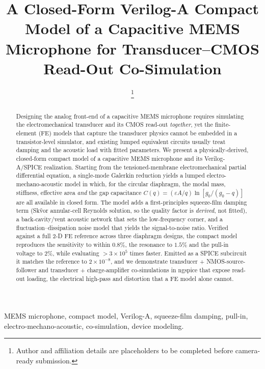 \documentclass[conference]{IEEEtran}
\begin{document}
\title{A Closed-Form Verilog-A Compact Model of a Capacitive MEMS Microphone
for Transducer--CMOS Read-Out Co-Simulation}

\author{
\thanks{Author and affiliation details are placeholders to be completed before
camera-ready submission.}}

\maketitle

\begin{abstract}
Designing the analog front-end of a capacitive MEMS microphone requires
simulating the electromechanical transducer and its CMOS read-out
\emph{together}, yet the finite-element (FE) models that capture the transducer
physics cannot be embedded in a transistor-level simulator, and existing
lumped equivalent circuits usually treat damping and the acoustic load with
fitted parameters. We present a physically-derived, closed-form compact model of
a capacitive MEMS microphone and its Verilog-A/SPICE realization. Starting from
the tensioned-membrane electromechanical partial differential equation, a
single-mode Galerkin reduction yields a lumped electro-mechano-acoustic model in
which, for the circular diaphragm, the modal mass, stiffness, effective area
\emph{and} the gap capacitance $C(q)=(\varepsilon A/q)\ln[g_0/(g_0-q)]$ are all
available in closed form. The model adds a first-principles squeeze-film damping
term (Sk\v{v}or annular-cell Reynolds solution, so the quality factor is
\emph{derived}, not fitted), a back-cavity/vent acoustic network that sets the
low-frequency corner, and a fluctuation--dissipation noise model that yields the
signal-to-noise ratio. Verified against a full 2-D FE reference across three
diaphragm designs, the compact model reproduces the sensitivity to within
$0.8\%$, the resonance to $1.5\%$ and the pull-in voltage to $2\%$, while
evaluating $>\!3\times10^{5}$ times faster. Emitted as a SPICE subcircuit it
matches the reference to $2\times10^{-8}$, and we demonstrate transducer +
NMOS-source-follower and transducer + charge-amplifier co-simulations in
ngspice that expose read-out loading, the electrical high-pass and distortion
that a FE model alone cannot.
\end{abstract}

\begin{IEEEkeywords}
MEMS microphone, compact model, Verilog-A, squeeze-film damping, pull-in,
electro-mechano-acoustic, co-simulation, device modeling.
\end{IEEEkeywords}
\end{document}
